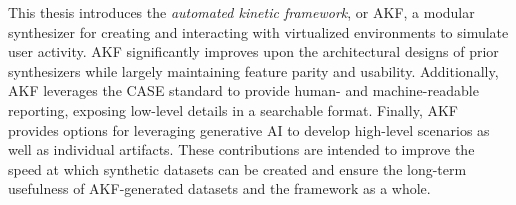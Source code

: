 This thesis introduces the \emph{\emph{automated kinetic framework}}, or
AKF, a modular synthesizer for creating and interacting with virtualized
environments to simulate user activity. AKF significantly improves upon
the architectural designs of prior synthesizers while largely
maintaining feature parity and usability. Additionally, AKF leverages
the CASE standard to provide human- and machine-readable reporting,
exposing low-level details in a searchable format. Finally, AKF provides
options for leveraging generative AI to develop high-level scenarios as
well as individual artifacts. These contributions are intended to
improve the speed at which synthetic datasets can be created and ensure
the long-term usefulness of AKF-generated datasets and the framework as
a whole.
